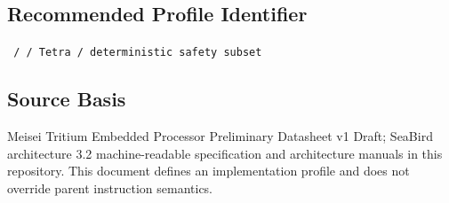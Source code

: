 \documentclass[10pt,letterpaper]{article}
\begin{document}
\subsection*{Recommended Profile Identifier}
\texttt{\ProfileID{} / \ParentISA{} / Tetra / deterministic safety subset}

\subsection*{Source Basis}
Meisei Tritium Embedded Processor Preliminary Datasheet v1 Draft; SeaBird architecture 3.2 machine-readable specification and architecture manuals in this repository. This document defines an implementation profile and does not override parent instruction semantics.
\end{document}
